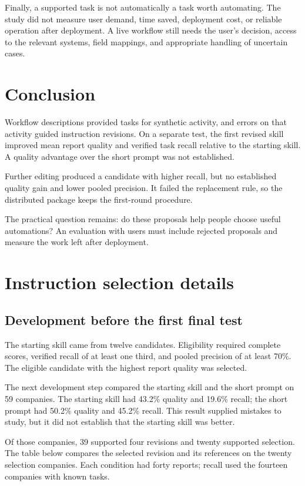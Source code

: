 \documentclass[11pt]{article}
\begin{document}
Finally, a supported task is not automatically a task worth automating. The study did not measure user demand, time saved, deployment cost, or reliable operation after deployment. A live workflow still needs the user's decision, access to the relevant systems, field mappings, and appropriate handling of uncertain cases.

\section{Conclusion}
Workflow descriptions provided tasks for synthetic activity, and errors on that activity guided instruction revisions. On a separate test, the first revised skill improved mean report quality and verified task recall relative to the starting skill. A quality advantage over the short prompt was not established.

Further editing produced a candidate with higher recall, but no established quality gain and lower pooled precision. It failed the replacement rule, so the distributed package keeps the first-round procedure.

The practical question remains: do these proposals help people choose useful automations? An evaluation with users must include rejected proposals and measure the work left after deployment.

\clearpage
\appendix
\section{Instruction selection details}
\subsection{Development before the first final test}
The starting skill came from twelve candidates. Eligibility required complete scores, verified recall of at least one third, and pooled precision of at least 70\%. The eligible candidate with the highest report quality was selected.

The next development step compared the starting skill and the short prompt on 59 companies. The starting skill had 43.2\% quality and 19.6\% recall; the short prompt had 50.2\% quality and 45.2\% recall. This result supplied mistakes to study, but it did not establish that the starting skill was better.

Of those companies, 39 supported four revisions and twenty supported selection. The table below compares the selected revision and its references on the twenty selection companies. Each condition had forty reports; recall used the fourteen companies with known tasks.
\end{document}
